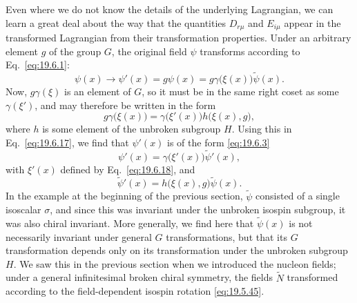 Even where we do not know the details of the underlying Lagrangian, we can learn a great deal about the way that the quantities $D_{r\mu}$ and $E_{i\mu}$ appear in the transformed Lagrangian from their transformation properties. Under an arbitrary element $g$ of the group $G$, the original field $\psi$ transforms according to Eq.~\eqref{eq:19.6.1}:
\begin{equation}
\psi(x)\longrightarrow\psi'(x)
=g\psi(x)=g\gamma\bigl(\xi(x)\bigr)\widetilde\psi(x).
\tag{19.6.17}\label{eq:19.6.17}
\end{equation}
Now, $g\gamma(\xi)$ is an element of $G$, so it must be in the same right coset as some $\gamma(\xi')$, and may therefore be written in the form
\begin{equation}
g\gamma\bigl(\xi(x)\bigr)
=\gamma\bigl(\xi'(x)\bigr)h\bigl(\xi(x),g\bigr),
\tag{19.6.18}\label{eq:19.6.18}
\end{equation}
where $h$ is some element of the unbroken subgroup $H$. Using this in Eq.~\eqref{eq:19.6.17}, we find that $\psi'(x)$ is of the form \eqref{eq:19.6.3}
\begin{equation}
\psi'(x)=\gamma\bigl(\xi'(x)\bigr)\widetilde\psi'(x),
\tag{19.6.19}\label{eq:19.6.19}
\end{equation}
with $\xi'(x)$ defined by Eq.~\eqref{eq:19.6.18}, and
\begin{equation}
\widetilde\psi'(x)
=h\bigl(\xi(x),g\bigr)\widetilde\psi(x).
\tag{19.6.20}\label{eq:19.6.20}
\end{equation}
In the example at the beginning of the previous section, $\widetilde\psi$ consisted of a single isoscalar $\sigma$, and since this was invariant under the unbroken isospin subgroup, it was also chiral invariant. More generally, we find here that $\widetilde\psi(x)$ is not necessarily invariant under general $G$ transformations, but that its $G$ transformation depends only on its transformation under the unbroken subgroup $H$. We saw this in the previous section when we introduced the nucleon fields; under a general infinitesimal broken chiral symmetry, the fields $\widetilde N$ transformed according to the field-dependent isospin rotation \eqref{eq:19.5.45}.

